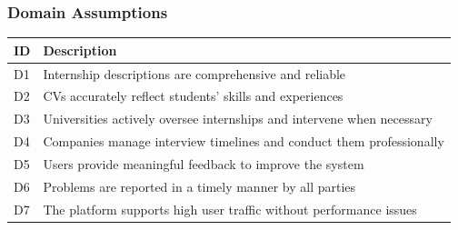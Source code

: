 \subsubsection{Domain Assumptions}
\begin{center}
    {\renewcommand{\arraystretch}{2}
    \begin{tabularx}{\textwidth}{p{2cm} X}
        \hline
        \textbf{ID} & \textbf{Description} \\ \hline
        D1 & Internship descriptions are comprehensive and reliable \\ \hline
        D2 & CVs accurately reflect students' skills and experiences \\ \hline
        D3 & Universities actively oversee internships and intervene when necessary \\ \hline
        D4 & Companies manage interview timelines and conduct them professionally \\ \hline
        D5 & Users provide meaningful feedback to improve the system \\ \hline
        D6 & Problems are reported in a timely manner by all parties \\ \hline
        D7 & The platform supports high user traffic without performance issues \\ \hline 
    \end{tabularx}}
\end{center}